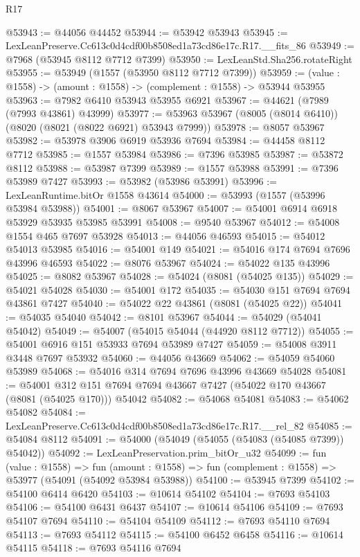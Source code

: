 \begin{lexlean}{R17}
\begin{coremodule}
@53943 := @44056 @44452
@53944 := @53942 @53943
@53945 := LexLeanPreserve.Cc613c0d4cdf00b8508ed1a73cd86e17c.R17.__fits_86
@53949 := @7968 (@53945 @8112 @7712 @7399)
@53950 := LexLeanStd.Sha256.rotateRight
@53955 := @53949 (@1557 (@53950 @8112 @7712 @7399))
@53959 := (value : @1558) -> (amount : @1558) -> (complement : @1558) -> @53944 @53955
@53963 := @7982 @6410 @53943 @53955 @6921
@53967 := @44621 (@7989 (@7993 @43861) @43999)
@53977 := @53963 @53967 (@8005 (@8014 @6410)) (@8020 (@8021 (@8022 @6921) @53943 @7999))
@53978 := @8057 @53967
@53982 := @53978 @3906 @6919 @53936 @7694
@53984 := @44458 @8112 @7712
@53985 := @1557 @53984
@53986 := @7396 @53985
@53987 := @53872 @8112
@53988 := @53987 @7399
@53989 := @1557 @53988
@53991 := @7396 @53989 @7427
@53993 := @53982 (@53986 @53991)
@53996 := LexLeanRuntime.bitOr @1558 @43614
@54000 := @53993 (@1557 (@53996 @53984 @53988))
@54001 := @8067 @53967
@54007 := @54001 @6914 @6918 @53929 @53935 @53985 @53991
@54008 := @9540 @53967
@54012 := @54008 @1554 @465 @7697 @53928
@54013 := @44056 @46593
@54015 := @54012 @54013 @53985
@54016 := @54001 @149
@54021 := @54016 @174 @7694 @7696 @43996 @46593
@54022 := @8076 @53967
@54024 := @54022 @135 @43996
@54025 := @8082 @53967
@54028 := @54024 (@8081 (@54025 @135))
@54029 := @54021 @54028
@54030 := @54001 @172
@54035 := @54030 @151 @7694 @7694 @43861 @7427
@54040 := @54022 @22 @43861 (@8081 (@54025 @22))
@54041 := @54035 @54040
@54042 := @8101 @53967
@54044 := @54029 (@54041 @54042)
@54049 := @54007 (@54015 @54044 (@44920 @8112 @7712))
@54055 := @54001 @6916 @151 @53933 @7694 @53989 @7427
@54059 := @54008 @3911 @3448 @7697 @53932
@54060 := @44056 @43669
@54062 := @54059 @54060 @53989
@54068 := @54016 @314 @7694 @7696 @43996 @43669 @54028
@54081 := @54001
    @312
    @151
    @7694
    @7694
    @43667
    @7427
    (@54022 @170 @43667 (@8081 (@54025 @170)))
    @54042
@54082 := @54068 @54081
@54083 := @54062 @54082
@54084 := LexLeanPreserve.Cc613c0d4cdf00b8508ed1a73cd86e17c.R17.__rel_82
@54085 := @54084 @8112
@54091 := @54000 (@54049 (@54055 (@54083 (@54085 @7399)) @54042))
@54092 := LexLeanPreservation.prim_bitOr_u32
@54099 := fun (value : @1558) =>
  fun (amount : @1558) => fun (complement : @1558) => @53977 (@54091 (@54092 @53984 @53988))
@54100 := @53945 @7399
@54102 := @54100 @6414 @6420
@54103 := @10614 @54102
@54104 := @7693 @54103
@54106 := @54100 @6431 @6437
@54107 := @10614 @54106
@54109 := @7693 @54107 @7694
@54110 := @54104 @54109
@54112 := @7693 @54110 @7694
@54113 := @7693 @54112
@54115 := @54100 @6452 @6458
@54116 := @10614 @54115
@54118 := @7693 @54116 @7694

\end{coremodule}
\end{lexlean}
